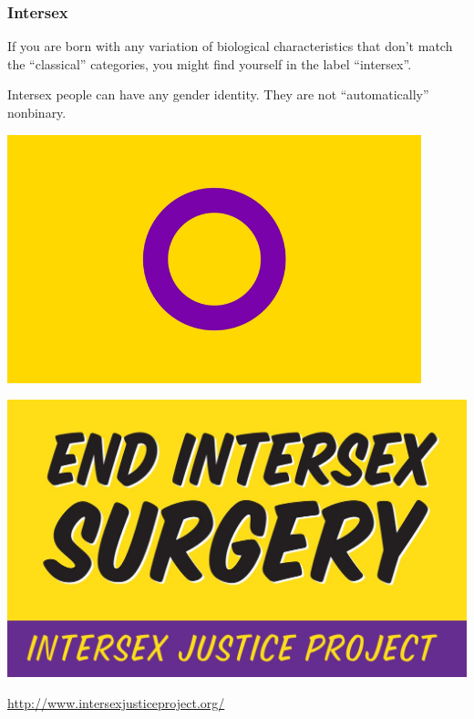 \documentclass[aspectratio=169,x11names]{beamer}
\begin{document}
\begin{frame}
\frametitle{Intersex}
\begin{minipage}{0.475\textwidth}
\large
If you are born with any variation of biological characteristics that don't match the ``classical'' categories, you might find yourself in the label ``intersex''. 
\bigskip

Intersex people can have any gender identity. They are not ``automatically'' nonbinary.
\end{minipage}
\hfill
\begin{minipage}{0.45\textwidth}
\begin{center}
\includegraphics[width=0.9\textwidth,keepaspectratio]{images/800px-Intersex-2.png} 
\end{center}
\end{minipage}
\end{frame}

\begin{frame}
\begin{center}
\includegraphics[height=0.6\textheight,keepaspectratio]{images/end_intersex_surgeries.jpg} 
\bigskip

\large
\url{http://www.intersexjusticeproject.org/}
\end{center}
\end{frame}
\end{document}
